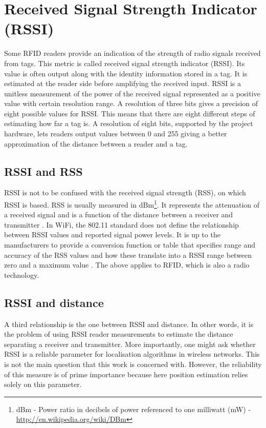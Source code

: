 \section{Received Signal Strength Indicator (RSSI)}
\label{sec:rssi}

Some RFID readers provide an indication of the strength of radio signals received from tags. This metric is called received signal strength indicator (RSSI). Its value is often output along with the identity information stored in a tag. It is estimated at the reader side before amplifying the received input. RSSI is a unitless measurement of the power of the received signal represented as a positive value with certain resolution range. A resolution of three bits gives a precision of eight possible values for RSSI. This means that there are eight different steps of estimating how far a tag is. A resolution of eight bits, supported by the project hardware, lets readers output values between 0 and 255 giving a better approximation of the distance between a reader and a tag. 

\subsection{RSSI and RSS}
\label{subsec:rssiandrss}

RSSI is not to be confused with the received signal strength (RSS), on which RSSI is based. RSS is usually measured in dBm\footnote{dBm - Power ratio in decibels of power referenced to one milliwatt (mW) - \url{http://en.wikipedia.org/wiki/DBm}}. It represents the attenuation of a received signal and is a function of the distance between a receiver and transmitter \cite{Bouet2008}. In WiFi, the 802.11 standard does not define the relationship between RSSI values and reported signal power levels. It is up to the manufacturers to provide a conversion function or table that specifies range and accuracy of the RSS values and how these translate into a RSSI range between zero and a maximum value \cite{Lui2011}. The above applies to RFID, which is also a radio technology. 

\subsection{RSSI and distance}
\label{subsec:rsssianddist}

A third relationship is the one between RSSI and distance. In other words, it is the problem of using RSSI reader measurements to estimate the distance separating a receiver and transmitter. More importantly, one might ask whether RSSI is a reliable parameter for localisation algorithms in wireless networks. This is not the main question that this work is concerned with. However, the reliability of this measure is of prime importance because here position estimation relies solely on this parameter. 

